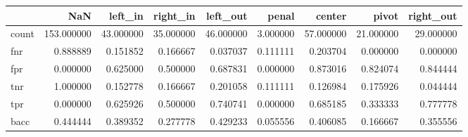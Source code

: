 \begin{tabular}{lrrrrrrrr}
\toprule
{} &         NaN &    left\_in &   right\_in &   left\_out &     penal &     center &      pivot &  right\_out \\
\midrule
count &  153.000000 &  43.000000 &  35.000000 &  46.000000 &  3.000000 &  57.000000 &  21.000000 &  29.000000 \\
fnr   &    0.888889 &   0.151852 &   0.166667 &   0.037037 &  0.111111 &   0.203704 &   0.000000 &   0.000000 \\
fpr   &    0.000000 &   0.625000 &   0.500000 &   0.687831 &  0.000000 &   0.873016 &   0.824074 &   0.844444 \\
tnr   &    1.000000 &   0.152778 &   0.166667 &   0.201058 &  0.111111 &   0.126984 &   0.175926 &   0.044444 \\
tpr   &    0.000000 &   0.625926 &   0.500000 &   0.740741 &  0.000000 &   0.685185 &   0.333333 &   0.777778 \\
bacc  &    0.444444 &   0.389352 &   0.277778 &   0.429233 &  0.055556 &   0.406085 &   0.166667 &   0.355556 \\
\bottomrule
\end{tabular}
